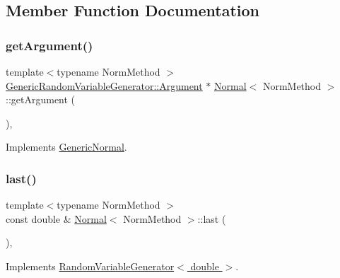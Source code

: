 \subsection{Member Function Documentation}
\hypertarget{class_normal_ac4048e25ff218cfb6052bd1b022b1591}{}\label{class_normal_ac4048e25ff218cfb6052bd1b022b1591} 
\subsubsection{\texorpdfstring{get\+Argument()}{getArgument()}}
{\footnotesize\ttfamily template$<$typename Norm\+Method $>$ \\
\hyperlink{class_generic_random_variable_generator_1_1_argument}{Generic\+Random\+Variable\+Generator\+::\+Argument} $\ast$ \hyperlink{class_normal}{Normal}$<$ Norm\+Method $>$\+::get\+Argument (\begin{DoxyParamCaption}{ }\end{DoxyParamCaption})\hspace{0.3cm}{\ttfamily [override]}, {\ttfamily [virtual]}}



Implements \hyperlink{class_generic_normal_a3006d271c692bc02b64b538342592e4d}{Generic\+Normal}.

\hypertarget{class_normal_a3f10787d08cb2479764d7e0da8256aa7}{}\label{class_normal_a3f10787d08cb2479764d7e0da8256aa7} 
\subsubsection{\texorpdfstring{last()}{last()}}
{\footnotesize\ttfamily template$<$typename Norm\+Method $>$ \\
const double \& \hyperlink{class_normal}{Normal}$<$ Norm\+Method $>$\+::last (\begin{DoxyParamCaption}{ }\end{DoxyParamCaption})\hspace{0.3cm}{\ttfamily [override]}, {\ttfamily [virtual]}}



Implements \hyperlink{class_random_variable_generator_aa84922aa58871845bc12116e05e6b5d4}{Random\+Variable\+Generator$<$ double $>$}.

\hypertarget{class_normal_a2cd9c31195181491a4bf0d3856746437}{}\label{class_normal_a2cd9c31195181491a4bf0d3856746437} 
